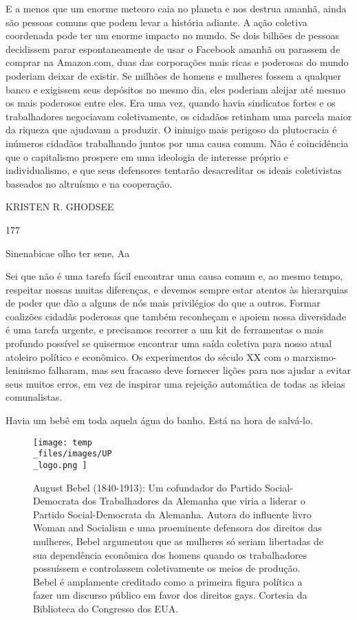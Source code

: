  \par 
E a menos que um enorme meteoro caia no planeta e nos destrua amanhã, ainda são pessoas comuns que podem levar a história adiante. A ação coletiva coordenada pode ter um enorme impacto no mundo. Se dois bilhões de pessoas decidissem parar espontaneamente de usar o Facebook amanhã ou parassem de comprar na Amazon.com, duas das corporações mais ricas e poderosas do mundo poderiam deixar de existir. Se milhões de homens e mulheres fossem a qualquer banco e exigissem seus depósitos no mesmo dia, eles poderiam aleijar até mesmo os mais poderosos entre eles. Era uma vez, quando havia sindicatos fortes e os trabalhadores negociavam coletivamente, os cidadãos retinham uma parcela maior da riqueza que ajudavam a produzir. O inimigo mais perigoso da plutocracia é inúmeros cidadãos trabalhando juntos por uma causa comum. Não é coincidência que o capitalismo prospere em uma ideologia de interesse próprio e individualismo, e que seus defensores tentarão desacreditar os ideais coletivistas baseados no altruísmo e na cooperação.
 \par 
KRISTEN R. GHODSEE
 \par 
177
 \par 
Sinenabicae olho ter sene, Aa
 \par 
Sei que não é uma tarefa fácil encontrar uma causa comum e, ao mesmo tempo, respeitar nossas muitas diferenças, e devemos sempre estar atentos às hierarquias de poder que dão a alguns de nós mais privilégios do que a outros. Formar coalizões cidadãs poderosas que também reconheçam e apoiem nossa diversidade é uma tarefa urgente, e precisamos recorrer a um kit de ferramentas o mais profundo possível se quisermos encontrar uma saída coletiva para nosso atual atoleiro político e econômico. Os experimentos do século XX com o marxismo-leninismo falharam, mas seu fracasso deve fornecer lições para nos ajudar a evitar seus muitos erros, em vez de inspirar uma rejeição automática de todas as ideias comunalistas.
 \par 
Havia um bebê em toda aquela água do banho. Está na hora de salvá-lo.
 \par 
\begin{figure}
	\centering
	\texttt{[image: temp\\\_files/images/UP\\\_logo.png ]}
	\caption{August Bebel (1840-1913): Um cofundador do Partido Social-Democrata dos Trabalhadores da Alemanha que viria a liderar o Partido Social-Democrata da Alemanha. Autora do influente livro Woman and Socialism e uma proeminente defensora dos direitos das mulheres, Bebel argumentou que as mulheres só seriam libertadas de sua dependência econômica dos homens quando os trabalhadores possuíssem e controlassem coletivamente os meios de produção. Bebel é amplamente creditado como a primeira figura política a fazer um discurso público em favor dos direitos gays. Cortesia da Biblioteca do Congresso dos EUA.}
	\label{ }
\end{figure}